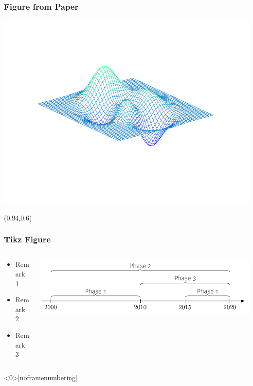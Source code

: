 \documentclass[12pt,aspectratio=169,xcolor=dvipsnames,hyperref={colorlinks=true,linkcolor=blue,citecolor=black}]{beamer}
\begin{document}
\begin{frame}[label=figureex]
	\frametitle{Figure from Paper}
	\begin{center}
		\includegraphics[trim={0cm 0cm 0cm 1cm},clip,height=0.85\textheight,width=\textwidth,keepaspectratio]{../Figures/Plain/exfigure1}
	\end{center}
	
	\begin{textblock*}{3cm}(0.94\textwidth,0.6\textheight)	%
		\hyperlink{examples}{}
	\end{textblock*}
\end{frame}


\begin{frame}
	\frametitle{Tikz Figure}
	\begin{columns}[T] 										%
		\begin{column}{0.35\textwidth}
			\begin{itemize}
				\item Remark 1
				\item Remark 2
				\item Remark 3
			\end{itemize}
		\end{column}
	\hfill
		\begin{column}{0.61\textwidth}
			\begin{center}
				\includegraphics[height=\textheight,width=\textwidth,keepaspectratio]{../Figures/Tikz/extikz}
			\end{center}
		\end{column}%
	\end{columns}
\end{frame}


\begin{frame}<0>[noframenumbering]							%
\end{frame}
\end{document}
